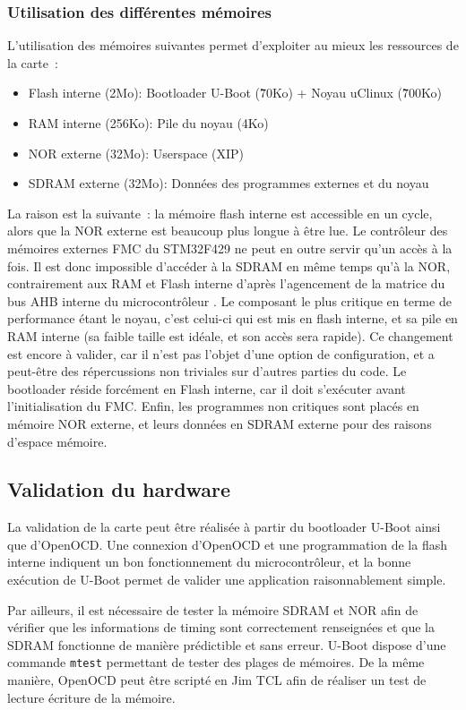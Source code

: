 \subsubsection{Utilisation des différentes mémoires}
L'utilisation des mémoires suivantes permet d'exploiter au mieux les ressources de la carte~:
\begin{itemize}
	\item Flash interne (2Mo): Bootloader U-Boot (\~70Ko) + Noyau uClinux (\~700Ko)
	\item RAM interne (256Ko): Pile du noyau (4Ko)
	\item NOR externe (32Mo): Userspace (XIP)
	\item SDRAM externe (32Mo): Données des programmes externes et du noyau
\end{itemize}
La raison est la suivante~: la mémoire flash interne est accessible en un cycle, alors que la NOR externe est beaucoup plus longue à être lue.
Le contrôleur des mémoires externes \gls{FMC} du STM32F429 ne peut en outre servir qu'un accès à la fois.
Il est donc impossible d'accéder à la SDRAM en même temps qu'à la NOR, contrairement aux RAM et Flash interne d'après l'agencement de la matrice du bus \gls{AHB} interne du microcontrôleur \autocite{STM:ReferenceManual}.
Le composant le plus critique en terme de performance étant le noyau, c'est celui-ci qui est mis en flash interne, et sa pile en RAM interne (sa faible taille est idéale, et son accès sera rapide).
Ce changement est encore à valider, car il n'est pas l'objet d'une option de configuration, et a peut-être des répercussions non triviales sur d'autres parties du code.
Le bootloader réside forcément en Flash interne, car il doit s'exécuter avant l'initialisation du \gls{FMC}.
Enfin, les programmes non critiques sont placés en mémoire NOR externe, et leurs données en SDRAM externe pour des raisons d'espace mémoire.


\subsection{Validation du hardware}
La validation de la carte peut être réalisée à partir du bootloader U-Boot ainsi que d'OpenOCD.
Une connexion d'OpenOCD et une programmation de la flash interne indiquent un bon fonctionnement du microcontrôleur, et la bonne exécution de U-Boot permet de valider une application  raisonnablement simple.
        
Par ailleurs, il est nécessaire de tester la mémoire SDRAM et NOR afin de vérifier que les informations de timing sont correctement renseignées et que la SDRAM fonctionne de manière prédictible et sans erreur. 
U-Boot dispose d'une commande \texttt{mtest} permettant de tester des plages de mémoires.
De la même manière, OpenOCD peut être scripté en Jim TCL afin de réaliser un test de lecture écriture de la mémoire.
	
